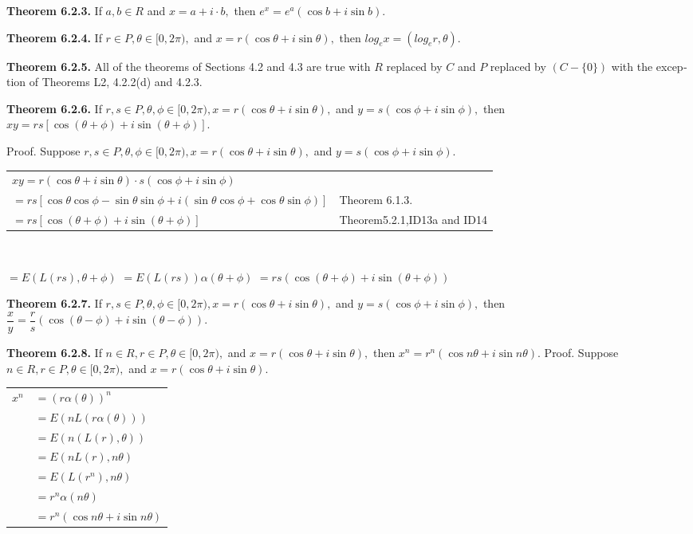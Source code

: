 \textbf{Theorem 6.2.3.} If $a,b\in R$ and $x = a+i·b,$ then $e^{x} =e^{a}(\cos b +i\sin b).$\nl

\textbf{Theorem 6.2.4.} If $r\in P, \theta \in  [0,2\pi),$ and $x = r(\cos \theta + i\sin \theta),$ then
$log_{e}x = (log_{e}r, \theta).$\nl

\textbf{Theorem 6.2.5.} All of the theorems of Sections 4.2 and 4.3 are true with $R$ replaced by $C$ and $P$ replaced by $(C - \{0\})$ with the excep­tion of Theorems L2, 4.2.2(d) and 4.2.3.\nl

\textbf{Theorem 6.2.6.} If $r,s\in P, \theta,\phi \in [0,2\pi), x = r(\cos \theta + i\sin \theta),$ and $y = s(\cos \phi + i\sin \phi ),$ then $xy = rs[\cos( \theta + \phi) + i\sin( \theta + \phi )].$\nl

Proof. Suppose  $r,s\in P, \theta,\phi \in [0,2\pi), x = r(\cos \theta + i\sin \theta),$ and $y = s(\cos \phi + i\sin \phi ).$\nl
\begin{tabular}{l l}
$xy = r\left(\cos\theta + i\sin\theta\right)\cdot s\left(\cos\phi + i\sin\phi\right)$&\\
$=rs[\cos\theta\cos\phi - \sin\theta\sin\phi + i\left(\sin\theta\cos\phi + \cos\theta\sin\phi\right)]$&Theorem 6.1.3.\\
$=rs[\cos(\theta + \phi) + i\sin(\theta + \phi)]$&Theorem5.2.1,ID13a and ID14\\
\end{tabular}\\

\newpage



\indent $=E(L(rs), \theta + \phi)$\nl
\indent $=E(L(rs))\alpha ( \theta + \phi)$\nl
\indent $=rs(\cos( \theta + \phi) + i\sin( \theta + \phi))$\nl

\textbf{Theorem 6.2.7.} If $r,s\in P, \theta,\phi  \in [0,2\pi), x=r(\cos \theta  + i\sin \theta),$ and
$y = s(\cos \phi + i\sin \phi),$ then $\dfrac{x}{y} = \dfrac{r}{s}(\cos( \theta - \phi) + i\sin( \theta - \phi )).$\nl

\textbf{Theorem 6.2.8.} If $n\in R, r\in P, \theta \in [0,2\pi),$ and $x = r(\cos \theta + i\sin \theta),$ then $x^{n} = r^{n}(\cos n\theta + i\sin n\theta).$\nl
Proof. Suppose  $n\in R, r\in P, \theta \in [0,2\pi),$ and $x = r(\cos \theta + i\sin \theta).$\nl
\begin{tabular}{r l}
$x^{n}$&$=(r\alpha(\theta))^{n}$\\
&$=E(nL(r\alpha (\theta)))$\\
&$=E(n(L(r), \theta))$\\
&$=E(nL(r),n\theta ) $\\
&$=E(L(r^{n}),n\theta )$\\
&$=r^{n}\alpha(n\theta)$\\
&$=r^{n}(\cos n\theta + i\sin n\theta)$\\
\end{tabular}\\

